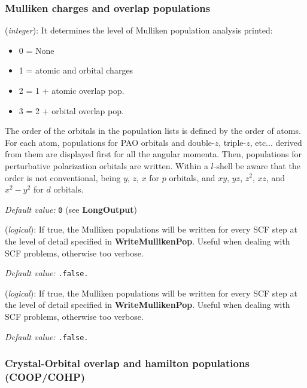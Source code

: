\documentclass[11pt]{article}
\begin{document}
\subsubsection{Mulliken charges and overlap populations}
\begin{description}
\itemsep 10pt
\parsep 0pt

\item[{\bf WriteMullikenPop}] ({\it integer}): 
It determines the level of Mulliken population analysis printed:
\begin{itemize}
\item 0 = None
\item 1 = atomic and orbital charges
\item 2 = 1 + atomic overlap pop.
\item 3 = 2 + orbital overlap pop.
\end{itemize}
The order of the orbitals in the population lists is defined
by the order of atoms. For each atom, populations for PAO orbitals and
double-$z$, triple-$z$, etc... derived from them are displayed first for 
all the angular momenta. Then, populations for perturbative polarization
orbitals are written.
Within a $l$-shell be aware that the order is not
conventional, being $y$, $z$, $x$ for $p$ orbitals, and
$xy$, $yz$, $z^2$, $xz$, and $x^2-y^2$ for $d$ orbitals. 

{\it Default value:} {\tt 0} (see {\bf LongOutput})


\item[{\bf MullikenInSCF}] ({\it logical}):
If true, the Mulliken populations will be written for every SCF step
at the level of detail specified in {\bf WriteMullikenPop}. Useful
when dealing with SCF problems, otherwise too verbose.

{\it Default value:} {\tt .false.}

\item[{\bf MullikenInSCF}] ({\it logical}):
If true, the Mulliken populations will be written for every SCF step
at the level of detail specified in {\bf WriteMullikenPop}. Useful
when dealing with SCF problems, otherwise too verbose.

{\it Default value:} {\tt .false.}

\end{description}

\subsubsection{Crystal-Orbital overlap and hamilton populations (COOP/COHP)}
\label{sec:coop}
\end{document}
